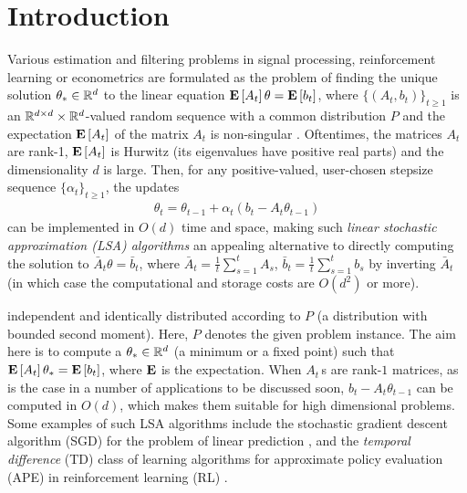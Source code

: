 \section{Introduction}\label{sec:intro}
Various estimation and filtering problems in signal processing, reinforcement learning or econometrics
are formulated as the problem of finding the unique solution $\theta_*\in \mathbb{R}^d$ 
to the linear equation $\mathbf{E}\left[A_t\right] \theta = \mathbf{E}\left[b_t\right]$,
where $\{(A_t,b_t)\}_{t\ge 1}$ is an $\mathbb{R}^{d \times d}\times \mathbb{R}^d$-valued random sequence with a common distribution $P$
and the expectation $\mathbf{E}\left[A_t\right]$ of the matrix $A_t$ is non-singular \citep[e.g.,][]{bemepri90,LjPfWa92,SoKo94,degylu96,
sutton,konda-tsitsiklis,KoTsi03LSA,gtd,gtd2,gtdmp}.
Oftentimes, the matrices $A_t$ are rank-1, $\mathbf{E}\left[A_t\right]$ is Hurwitz (its eigenvalues have positive real parts)
and the dimensionality $d$ is large.
Then, for any positive-valued, user-chosen stepsize sequence $\{\alpha_t\}_{t\ge 1}$, the updates
\begin{align}\label{eq:lsaintro}
\theta_t=\theta_{t-1}+\alpha_t (b_t-A_t \theta_{t-1})
\end{align}
can be implemented in $O(d)$ time and space, making such 
\emph{linear stochastic approximation (LSA) algorithms} 
an appealing alternative to directly 
computing the solution to $\bar A_t \theta = \bar b_t$, where $\bar A_t = \frac1t\sum_{s=1}^t A_s$, $\bar b_t = \frac1t \sum_{s=1}^t b_s$ by inverting $\bar A_t$ (in which case the computational and storage costs are $O(d^2)$ or more).

independent and identically distributed according to $P$ (a distribution with bounded second moment). Here, $P$ denotes the given problem instance. The aim here is to compute a $\theta_*\in\mathbb{R}^d$ (a minimum or a fixed point) such that $\mathbf{E}\left[A_t\right]\theta_*=\mathbf{E}\left[b_t\right]$, where $\mathbf{E}$ is the expectation. When $A_t\,$s are rank-$1$ matrices, as is the case in a number of applications to be discussed soon, $b_t -A_t\theta_{t-1}$ can be computed in $O(d)$, which makes them suitable for high dimensional problems. Some examples of such LSA algorithms include the stochastic gradient descent algorithm (SGD) for the problem of linear prediction \cite{bach,bachaistats}, and the \emph{temporal difference} (TD) class of learning algorithms for approximate policy evaluation (APE) in reinforcement learning (RL) \cite{sutton,konda-tsitsiklis,KoTsi03LSA,gtd,gtd2,gtdmp}.
\fi


